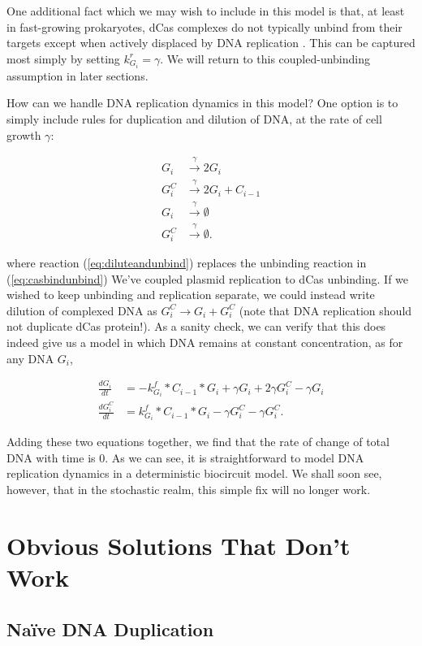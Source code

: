 \documentclass[preprint,12pt]{elsarticle}
\begin{document}
One additional fact which we may wish to include in this model is that, at least in fast-growing prokaryotes, dCas complexes do not typically unbind from their targets except when actively displaced by DNA replication \cite{Jones2017}. This can be captured most simply by setting $k_{G_i}^r = \gamma$. We will return to this coupled-unbinding assumption in later sections. 

How can we handle DNA replication dynamics in this model? One option is to simply include rules for duplication and dilution of DNA, at the rate of cell growth $\gamma$:

\begin{align}
	G_i &\xrightarrow{\gamma} 2G_i\\
	\label{eq:diluteandunbind} G_i^C &\xrightarrow{\gamma} 2G_i + C_{i-1}\\
	G_i &\xrightarrow{\gamma} \emptyset \\
	G_i^C &\xrightarrow{\gamma} \emptyset.
\end{align}

where reaction (\ref{eq:diluteandunbind}) replaces the unbinding reaction in (\ref{eq:casbindunbind}) We've coupled plasmid replication to dCas unbinding. If we wished to keep unbinding and replication separate, we could instead write dilution of complexed DNA as $G_i^C \rightarrow G_i + G_i^C$ (note that DNA replication should not duplicate dCas protein!). As a sanity check, we can verify that this does indeed give us a model in which DNA remains at constant concentration, as for any DNA $G_i$,

\begin{align}
	\frac{dG_i}{dt} &= -k^f_{G_i}*C_{i-1}*G_i + \gamma G_i + 2\gamma G_i^C - \gamma G_i\\
	\frac{dG_i^C}{dt} &= k^f_{G_i}*C_{i-1}*G_i - \gamma G_i^C - \gamma G_i^C.
\end{align}

Adding these two equations together, we find that the rate of change of total DNA with time is 0. As we can see, it is straightforward to model DNA replication dynamics in a deterministic biocircuit model. We shall soon see, however, that in the stochastic realm, this simple fix will no longer work. 

\section{Obvious Solutions That Don't Work}\label{S:failures}

\subsection{Na\"ive DNA Duplication}
\end{document}
